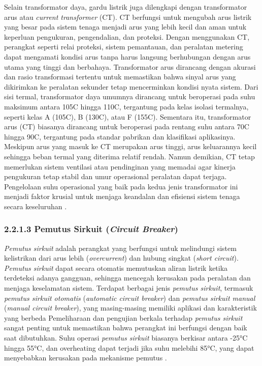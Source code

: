 Selain transformator daya, gardu listrik juga dilengkapi dengan transformator arus atau \emph{current transformer} (CT). CT berfungsi untuk mengubah arus listrik yang besar pada sistem tenaga menjadi arus yang lebih kecil dan aman untuk keperluan pengukuran, pengendalian, dan proteksi. Dengan menggunakan CT, perangkat seperti relai proteksi, sistem pemantauan, dan peralatan metering dapat mengamati kondisi arus tanpa harus langsung berhubungan dengan arus utama yang tinggi dan berbahaya. Transformator arus dirancang dengan akurasi dan rasio transformasi tertentu untuk memastikan bahwa sinyal arus yang dikirimkan ke peralatan sekunder tetap mencerminkan kondisi nyata sistem. Dari sisi termal, transformator daya umumnya dirancang untuk beroperasi pada suhu maksimum antara 105\textdegree{}C hingga 110\textdegree{}C, tergantung pada kelas isolasi termalnya, seperti kelas A (105\textdegree{}C), B (130\textdegree{}C), atau F (155\textdegree{}C). Sementara itu, transformator arus (CT) biasanya dirancang untuk beroperasi pada rentang suhu antara 70\textdegree{}C hingga 90\textdegree{}C, tergantung pada standar pabrikan dan klasifikasi aplikasinya. Meskipun arus yang masuk ke CT merupakan arus tinggi, arus keluarannya kecil sehingga beban termal yang diterima relatif rendah. Namun demikian, CT tetap memerlukan sistem ventilasi atau pendinginan yang memadai agar kinerja pengukuran tetap stabil dan umur operasional peralatan dapat terjaga. Pengelolaan suhu operasional yang baik pada kedua jenis transformator ini menjadi faktor krusial untuk menjaga keandalan dan efisiensi sistem tenaga secara keseluruhan \cite{stevenson1994power}.


\subsubsection{2.2.1.3 Pemutus Sirkuit (\emph{Circuit Breaker})}
\emph{Pemutus sirkuit} adalah perangkat yang berfungsi untuk melindungi sistem kelistrikan dari arus lebih (\emph{overcurrent}) dan hubung singkat (\emph{short circuit}). \emph{Pemutus sirkuit} dapat secara otomatis memutuskan aliran listrik ketika terdeteksi adanya gangguan, sehingga mencegah kerusakan pada peralatan dan menjaga keselamatan sistem. Terdapat berbagai jenis \emph{pemutus sirkuit}, termasuk \emph{pemutus sirkuit otomatis} (\emph{automatic circuit breaker}) dan \emph{pemutus sirkuit manual} (\emph{manual circuit breaker}), yang masing-masing memiliki aplikasi dan karakteristik yang berbeda Pemeliharaan dan pengujian berkala terhadap \emph{pemutus sirkuit} sangat penting untuk memastikan bahwa perangkat ini berfungsi dengan baik saat dibutuhkan. Suhu operasi \emph{pemutus sirkuit} biasanya berkisar antara -25°C hingga 55°C, dan overheating dapat terjadi jika suhu melebihi 85°C, yang dapat menyebabkan kerusakan pada mekanisme pemutus \cite{Ilomets2020}.


